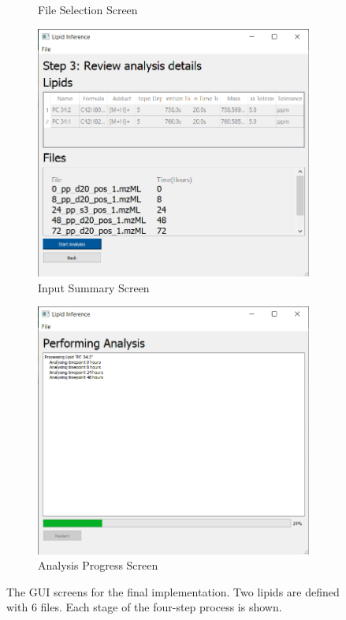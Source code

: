 \documentclass{l4proj}
\begin{document}
\begin{figure}[htb]
\begin{subfigure}{0.4\linewidth}
    \caption{File Selection Screen}
    \end{subfigure}
    \begin{subfigure}{0.4\linewidth}
        \includegraphics[width=\linewidth]{dissertation/images/Screen3.png}
    \caption{Input Summary Screen}
        \end{subfigure}
        \begin{subfigure}{0.4\linewidth}
        \includegraphics[width=\linewidth]{dissertation/images/Screen4.png}
    \caption{Analysis Progress Screen}
    \end{subfigure}
    \caption{The GUI screens for the final implementation. Two lipids are defined with 6 files. Each stage of the four-step process is shown.}
    \label{fig:gui-screens}
\end{figure}
\end{document}
